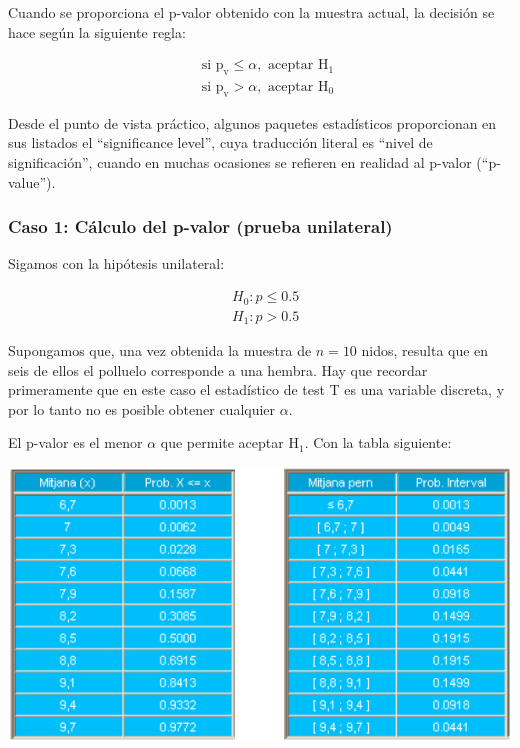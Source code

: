 \documentclass[
]{article}
\begin{document}
Cuando se proporciona el p-valor obtenido con la muestra actual, la decisión se hace según la siguiente regla:

\[
\begin{aligned}
& \text { si } \mathrm{p}_{\mathrm{v}} \leq \alpha, \text { aceptar } \mathrm{H}_{1} \\
& \text { si } \mathrm{p}_{\mathrm{v}}>\alpha, \text { aceptar } \mathrm{H}_{0}
\end{aligned}
\]

Desde el punto de vista práctico, algunos paquetes estadísticos proporcionan en sus listados el ``significance level'', cuya traducción literal es ``nivel de significación'', cuando en muchas ocasiones se refieren en realidad al p-valor (``p-value'').

\subsubsection{Caso 1: Cálculo del p-valor (prueba unilateral)}\label{caso-1-cuxe1lculo-del-p-valor-prueba-unilateral}

Sigamos con la hipótesis unilateral:

\[
\begin{aligned}
& H_{0}: p \leq 0.5 \\
& H_{1}: p>0.5
\end{aligned}
\]

Supongamos que, una vez obtenida la muestra de \(n=10\) nidos, resulta que en seis de ellos el polluelo corresponde a una hembra. Hay que recordar primeramente que en este caso el estadístico de test T es una variable discreta, y por lo tanto no es posible obtener cualquier \(\alpha\).

El p-valor es el menor \(\alpha\) que permite aceptar \(\mathrm{H}_{1}\). Con la tabla siguiente:

\begin{center}\includegraphics[width=0.9\linewidth]{images/cap9-comparaProbs} \end{center}
\end{document}
